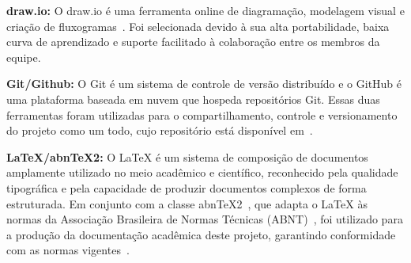 \textbf{draw.io:}
O draw.io é uma ferramenta online de diagramação, modelagem visual 
e criação de fluxogramas~\cite{drawio}. Foi selecionada devido à 
sua alta portabilidade, baixa curva de aprendizado e suporte 
facilitado à colaboração entre os membros da equipe.

\textbf{Git/Github:}
O Git é um sistema de controle de versão distribuído e o GitHub é 
uma plataforma baseada em nuvem que hospeda repositórios Git. Essas 
duas ferramentas foram utilizadas para o compartilhamento, controle 
e versionamento do projeto como um todo, cujo repositório está 
disponível em~\cite{repo}.

\textbf{LaTeX/abnTeX2:}
O LaTeX é um sistema de composição de documentos amplamente utilizado 
no meio acadêmico e científico, reconhecido pela qualidade tipográfica 
e pela capacidade de produzir documentos complexos de forma estruturada. 
Em conjunto com a classe abnTeX2~\cite{abntex2}, que adapta o LaTeX às 
normas da Associação Brasileira de Normas Técnicas (ABNT)~\cite{abnt14724}, 
foi utilizado para a produção da documentação acadêmica deste projeto, 
garantindo conformidade com as normas vigentes~\cite{abnt6023}.